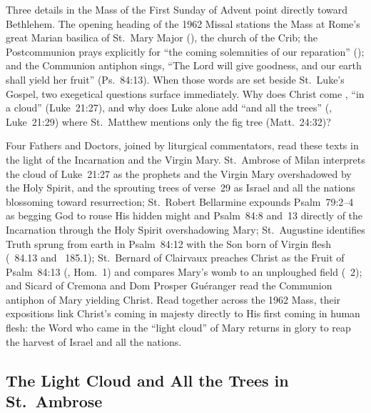 
Three details in the Mass of the First Sunday of Advent point directly toward Bethlehem. The opening heading of the 1962 Missal stations the Mass at Rome's great Marian basilica of St.~Mary Major (), the church of the Crib; the Postcommunion prays explicitly for ``the coming solemnities of our reparation'' (); and the Communion antiphon sings, ``The Lord will give goodness, and our earth shall yield her fruit'' (Ps.~84:13). When those words are set beside St.~Luke's Gospel, two exegetical questions surface immediately. Why does Christ come , ``in a cloud'' (Luke~21:27), and why does Luke alone add ``and all the trees'' (, Luke~21:29) where St.~Matthew mentions only the fig tree (Matt.~24:32)?

Four Fathers and Doctors, joined by liturgical commentators, read these texts in the light of the Incarnation and the Virgin Mary. St.~Ambrose of Milan interprets the cloud of Luke~21:27 as the prophets and the Virgin Mary overshadowed by the Holy Spirit, and the sprouting trees of verse~29 as Israel and all the nations blossoming toward resurrection; St.~Robert Bellarmine expounds Psalm~79:2--4 as begging God to rouse His hidden might and Psalm~84:8 and~13 directly of the Incarnation through the Holy Spirit overshadowing Mary; St.~Augustine identifies Truth sprung from earth in Psalm~84:12 with the Son born of Virgin flesh (~84.13 and ~185.1); St.~Bernard of Clairvaux preaches Christ as the Fruit of Psalm~84:13 (, Hom.~1) and compares Mary's womb to an unploughed field (~2); and Sicard of Cremona and Dom Prosper Gu\'eranger read the Communion antiphon of Mary yielding Christ. Read together across the 1962 Mass, their expositions link Christ's coming in majesty directly to His first coming in human flesh: the Word who came in the ``light cloud'' of Mary returns in glory to reap the harvest of Israel and all the nations.

\subsection{The Light Cloud and All the Trees in St.~Ambrose}

